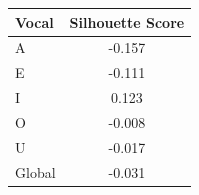 \begin{tabular}{lc}
\toprule
\rowcolor{col01}
Vocal & Silhouette Score \\
\midrule
A & -0.157 \\
E & -0.111 \\
I & 0.123 \\
O & -0.008 \\
U & -0.017 \\
Global & -0.031 \\
\bottomrule
\end{tabular}
